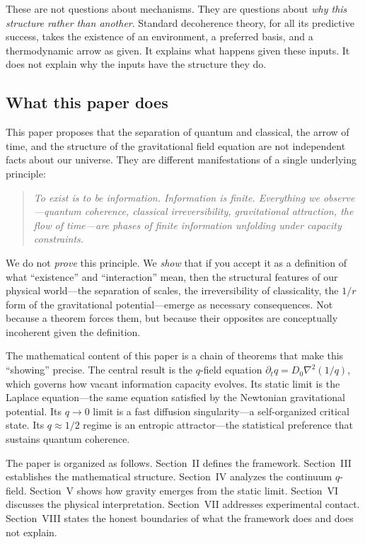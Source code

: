 \documentclass[reprint]{revtex4-2}
\begin{document}
These are not questions about mechanisms. They are questions about \emph{why this structure rather than another}. Standard decoherence theory, for all its predictive success, takes the existence of an environment, a preferred basis, and a thermodynamic arrow as given. It explains what happens given these inputs. It does not explain why the inputs have the structure they do.

\subsection{What this paper does}

This paper proposes that the separation of quantum and classical, the arrow of time, and the structure of the gravitational field equation are not independent facts about our universe. They are different manifestations of a single underlying principle:

\begin{quote}
\emph{To exist is to be information. Information is finite. Everything we observe---quantum coherence, classical irreversibility, gravitational attraction, the flow of time---are phases of finite information unfolding under capacity constraints.}
\end{quote}

We do not \emph{prove} this principle. We \emph{show} that if you accept it as a definition of what ``existence'' and ``interaction'' mean, then the structural features of our physical world---the separation of scales, the irreversibility of classicality, the $1/r$ form of the gravitational potential---emerge as necessary consequences. Not because a theorem forces them, but because their opposites are conceptually incoherent given the definition.

The mathematical content of this paper is a chain of theorems that make this ``showing'' precise. The central result is the $q$-field equation $\partial_t q = D_0\nabla^2(1/q)$, which governs how vacant information capacity evolves. Its static limit is the Laplace equation---the same equation satisfied by the Newtonian gravitational potential. Its $q\to 0$ limit is a fast diffusion singularity---a self-organized critical state. Its $q\approx 1/2$ regime is an entropic attractor---the statistical preference that sustains quantum coherence.

The paper is organized as follows. Section~II defines the framework. Section~III establishes the mathematical structure. Section~IV analyzes the continuum $q$-field. Section~V shows how gravity emerges from the static limit. Section~VI discusses the physical interpretation. Section~VII addresses experimental contact. Section~VIII states the honest boundaries of what the framework does and does not explain.
\end{document}
